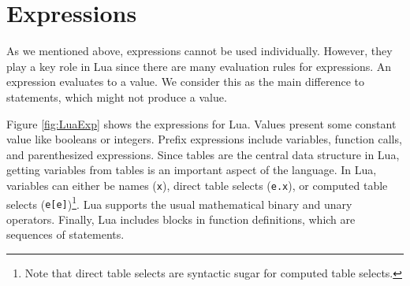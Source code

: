 \section{Expressions}
As we mentioned above, expressions cannot be used individually. However, they play a key role in Lua since there are many evaluation rules for expressions. An expression evaluates to a value. We consider this as the main difference to statements,
which might not produce a value.


Figure \ref{fig:LuaExp} shows the expressions for Lua.
%
Values present some constant value like booleans or integers.
Prefix expressions include variables, function calls, and parenthesized expressions.
Since tables are the central data structure in Lua,
getting variables from tables is an important aspect of the language.
In Lua, variables can either be names ({\tt x}), direct table selects ({\tt e.x}), or computed table selects ({\tt e[e]})\footnote{
Note that direct table selects are syntactic sugar for computed table selects.
}.
Lua supports the usual mathematical binary and unary operators.
Finally, Lua includes blocks in function definitions, which are sequences of statements.

